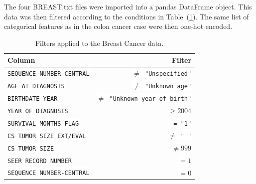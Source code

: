 \documentclass[a4paper,11pt]{article}
\newcommand{\codewhite}[1]{\colorbox{white}{\texttt{#1}}}
\begin{document}




 The four BREAST.txt files were imported into a pandas DataFrame object.
This data was then filtered according to the conditions in Table~(\ref{tab:breastfilter}).
The same list of categorical features as in the colon cancer case were then one-hot encoded.



\begin{table}[tbp]
\begin{center}
\begin{tabular}{lr}
\toprule
 Column &  Filter \\
\midrule
\codewhite{SEQUENCE NUMBER-CENTRAL} & \codewhite{$\neq$ "Unspecified"} \\
\codewhite{AGE AT DIAGNOSIS} & \codewhite{$\neq$ "Unknown age"} \\
\codewhite{BIRTHDATE-YEAR} & \codewhite{$\neq$ "Unknown year of birth"} \\
\codewhite{YEAR OF DIAGNOSIS} & \codewhite{$\geq 2004$} \\
\codewhite{SURVIVAL MONTHS FLAG} & \codewhite{= "1"}\\
\codewhite{CS TUMOR SIZE EXT/EVAL} & \codewhite{$\neq$ " "} \\
\codewhite{CS TUMOR SIZE} & \codewhite{$\neq 999$} \\
\codewhite{SEER RECORD NUMBER} & \codewhite{$= 1$} \\
\codewhite{SEQUENCE NUMBER-CENTRAL} & \codewhite{$=0$} \\
\bottomrule
\end{tabular}
\caption{\label{tab:breastfilter} Filters applied to the Breast Cancer data.}
\end{center}
\end{table}
\end{document}
